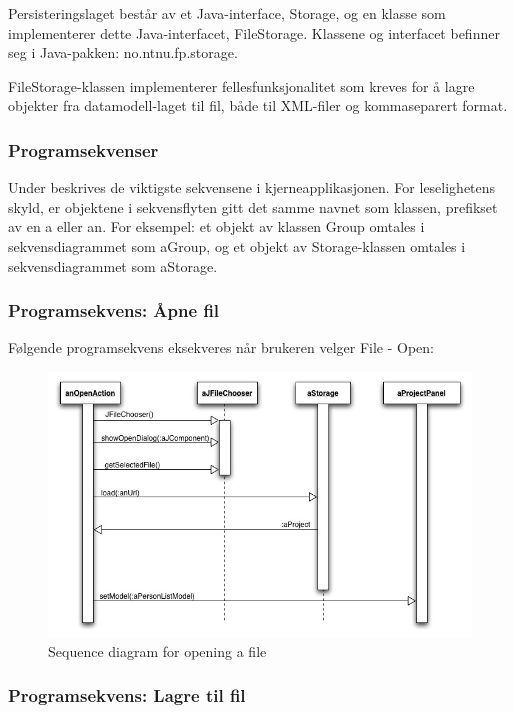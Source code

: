 Persisteringslaget består av et Java-interface, Storage, og en klasse som implementerer dette Java-interfacet, FileStorage. Klassene og interfacet befinner seg i Java-pakken: no.ntnu.fp.storage.

FileStorage-klassen implementerer fellesfunksjonalitet som kreves for å lagre objekter fra datamodell-laget til fil, både til XML-filer og kommaseparert format.

\subsubsection{Programsekvenser}

Under beskrives de viktigste sekvensene i kjerneapplikasjonen. For leselighetens skyld, er objektene i sekvensflyten gitt det samme navnet som klassen, prefikset av en a eller an. For eksempel: et objekt av klassen Group omtales i sekvensdiagrammet som aGroup, og et objekt av Storage-klassen omtales i sekvensdiagrammet som aStorage.


\subsubsection{Programsekvens: Åpne fil}

Følgende programsekvens eksekveres når brukeren velger File - Open:

\begin{figure}[H]
    \centering
    \includegraphics[width=\textwidth]{resources/sequence-open-file.jpg}
    \caption{Sequence diagram for opening a file}
    \label{fig:sequence-open-file}
\end{figure}

\subsubsection{Programsekvens: Lagre til fil}

